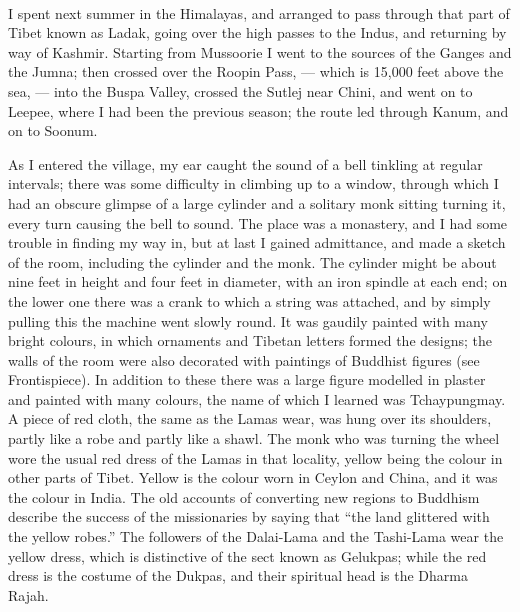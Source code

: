 \documentclass[a4paper, 11pt, oneside, polutonikogreek, english]{article}
\begin{document}
\paragraph{}
I spent next summer in the Himalayas, and arranged to pass through that part of Tibet known as Ladak, going over the high passes to the Indus, and returning by way of Kashmir. Starting from Mussoorie I went to the sources of the Ganges and the Jumna; then crossed over the Roopin Pass, --- which is 15,000 feet above the sea, --- into the Buspa Valley, crossed the Sutlej near Chini, and went on to Leepee, where I had been the previous season; the route led through Kanum, and on to Soonum.

As I entered the village, my ear caught the sound of a bell tinkling at regular intervals; there was some difficulty in climbing up to a window, through which I had an obscure glimpse of a large cylinder and a solitary monk sitting turning it, every turn causing the bell to sound. The place was a monastery, and I had some trouble in finding my way in, but at last I gained admittance, and made a sketch of the room, including the cylinder and the monk. The cylinder might be about nine feet in height and four feet in diameter, with an iron spindle at each end; on the lower one there was a crank to which a string was attached, and by simply pulling this the machine went slowly round. It was gaudily painted with many bright colours, in which ornaments and Tibetan letters formed the designs; the walls of the room were also decorated with paintings of Buddhist figures (see Frontispiece). In addition to these there was a large figure modelled in plaster and painted with many colours, the name of which I learned was Tchaypungmay. A piece of red cloth, the same as the Lamas wear, was hung over its shoulders, partly like a robe and partly like a shawl. The monk who was turning the wheel wore the usual red dress of the Lamas in that locality, yellow being the colour in other parts of Tibet. Yellow is the colour worn in Ceylon and China, and it was the colour in India. The old accounts of converting new regions to Buddhism describe the success of the missionaries by saying that ``the land glittered with the yellow robes.'' The followers of the Dalai-Lama and the Tashi-Lama wear the yellow dress, which is distinctive of the sect known as Gelukpas; while the red dress is the costume of the Dukpas, and their spiritual head is the Dharma Rajah.
\end{document}
